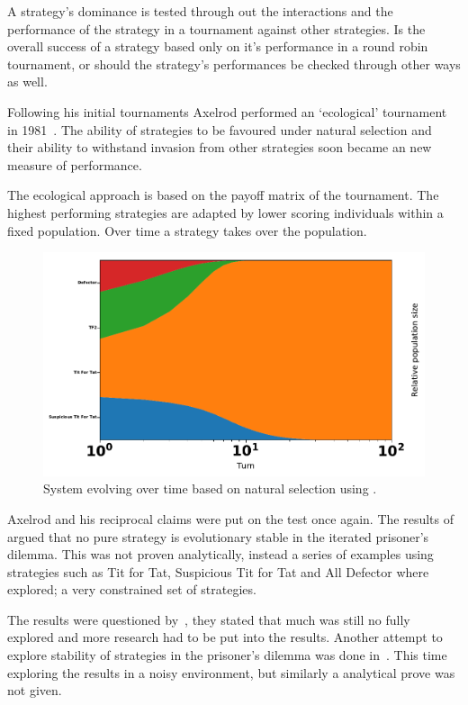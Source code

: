 \documentclass{article}
\begin{document}
A strategy's dominance is tested through out the interactions and the performance
of the strategy in a tournament against other strategies. Is the overall
success of a strategy based only on it's performance in a round robin tournament,
or should the strategy's performances be checked through other ways as well.

Following his initial tournaments Axelrod performed an `ecological' tournament
in 1981~\cite{Axelrod1981}. The ability of strategies to be favoured under
natural selection and their ability to withstand invasion from other strategies
soon became an new measure of performance. 

The ecological approach is based on the payoff matrix of the tournament.  The
highest performing strategies are adapted by lower scoring individuals
within a fixed population. Over time a strategy takes over the population.

\begin{figure}[!hbtp]
    \centering
    \includegraphics[width=.6\textwidth]{./assets/images/ecological.pdf}
    \caption{System evolving over time based on natural selection using
    \cite{axelrodproject}.}
    \label{fig:ecological.tournament}
\end{figure}

Axelrod and his reciprocal claims were put on the test once again. 
The results of~\cite{Boyd1987} argued that no pure strategy is evolutionary
stable in the iterated prisoner's dilemma. This was not proven analytically, instead
a series of examples using strategies such as Tit for Tat, Suspicious
Tit for Tat and All Defector where explored; a very constrained set of strategies.

The results were questioned by~\cite{May1987}, they stated that much was
still no fully explored and more research had to be put into the results.
Another attempt to explore stability of strategies in the prisoner's dilemma
was done in~\cite{Boyd1989}. This time exploring the results in a noisy
environment, but similarly a analytical prove was not given.
\end{document}

